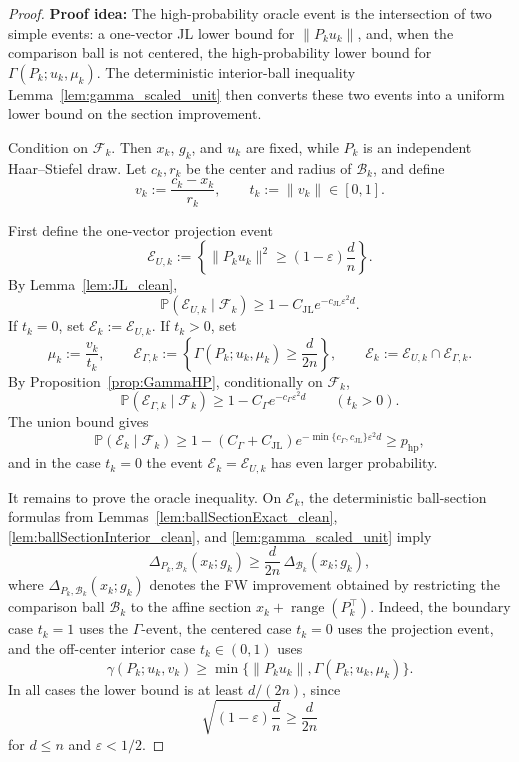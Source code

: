 \documentclass{article}
\DeclareMathOperator{\range}{range}
\begin{document}
\begin{proof}
\textbf{Proof idea:}
The high-probability oracle event is the intersection of two simple events: a
one-vector JL lower bound for \(\|P_ku_k\|\), and, when the comparison ball is
not centered, the high-probability lower bound for
\(\Gamma(P_k;u_k,\mu_k)\). The deterministic interior-ball inequality
Lemma~\ref{lem:gamma_scaled_unit} then converts these two events into a uniform
lower bound on the section improvement.



Condition on \(\mathcal F_k\). Then \(x_k\), \(g_k\), and \(u_k\) are fixed,
while \(P_k\) is an independent Haar--Stiefel draw. Let \(c_k,r_k\) be the
center and radius of \(\mathcal B_k\), and define
\[
v_k:=\frac{c_k-x_k}{r_k},
\qquad
t_k:=\|v_k\|\in[0,1].
\]

First define the one-vector projection event
\[
\mathcal E_{U,k}
:=
\left\{
\|P_ku_k\|^2
\ge
(1-\varepsilon)\frac dn
\right\}.
\]
By Lemma~\ref{lem:JL_clean},
\[
\mathbb P(\mathcal E_{U,k}\mid\mathcal F_k)
\ge
1-C_{\mathrm{JL}}e^{-c_{\mathrm{JL}}\varepsilon^2d}.
\]
If \(t_k=0\), set \(\mathcal E_k:=\mathcal E_{U,k}\). If \(t_k>0\), set
\[
\mu_k:=\frac{v_k}{t_k},
\qquad
\mathcal E_{\Gamma,k}
:=
\left\{
\Gamma(P_k;u_k,\mu_k)\ge\frac d{2n}
\right\},
\qquad
\mathcal E_k:=\mathcal E_{U,k}\cap\mathcal E_{\Gamma,k}.
\]
By Proposition~\ref{prop:GammaHP}, conditionally on \(\mathcal F_k\),
\[
\mathbb P(\mathcal E_{\Gamma,k}\mid\mathcal F_k)
\ge
1-C_{\Gamma}e^{-c_{\Gamma}\varepsilon^2d}
\qquad (t_k>0).
\]
The union bound gives
\[
\mathbb P(\mathcal E_k\mid\mathcal F_k)
\ge
1-(C_{\Gamma}+C_{\mathrm{JL}})
e^{-\min\{c_{\Gamma},c_{\mathrm{JL}}\}\varepsilon^2d}
\ge
p_{\mathrm{hp}},
\]
and in the case \(t_k=0\) the event \(\mathcal E_k=\mathcal E_{U,k}\) has even
larger probability.

It remains to prove the oracle inequality. On \(\mathcal E_k\), the deterministic
ball-section formulas from Lemmas~\ref{lem:ballSectionExact_clean},
\ref{lem:ballSectionInterior_clean}, and \ref{lem:gamma_scaled_unit} imply
\begin{equation}
\Delta_{P_k,\mathcal B_k}(x_k;g_k)
\ge
\frac d{2n}\,
\Delta_{\mathcal B_k}(x_k;g_k),
\label{eq:hp_ball_section_improvement}
\end{equation}
where \(\Delta_{P_k,\mathcal B_k}(x_k;g_k)\) denotes the FW improvement obtained
by restricting the comparison ball \(\mathcal B_k\) to the affine section
\(x_k+\range(P_k^\top)\). Indeed, the boundary case \(t_k=1\) uses the
\(\Gamma\)-event, the centered case \(t_k=0\) uses the projection event, and the
off-center interior case \(t_k\in(0,1)\) uses
\[
\gamma(P_k;u_k,v_k)
\ge
\min\{\|P_ku_k\|,\Gamma(P_k;u_k,\mu_k)\}.
\]
In all cases the lower bound is at least \(d/(2n)\), since
\[
\sqrt{(1-\varepsilon)\frac dn}\ge \frac d{2n}
\]
for \(d\le n\) and \(\varepsilon<1/2\).


\end{proof}
\end{document}

